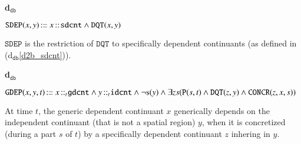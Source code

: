\documentclass[ao]{iosart2x}
\newcommand{\bfoAxLabel}{\textrm{a$_\texttt{b}$}}
\newcommand{\dolceDefLabel}{\textrm{d$_\texttt{d}$}}
\newcommand{\dbDefLabel}{\textrm{d$_\texttt{db}$}}
\newcounter{cntdbdf}
\newcommand{\dbdf}[1]{\refstepcounter{cntdbdf}\begin{small}{\bf \dbDefLabel\thecntdbdf\label{#1}}\end{small}}
\newcommand{\refdolcedf}[1]{({\dolceDefLabel}\ref{#1})}
\newcommand{\refbfoax}[1]{({\bfoAxLabel}\ref{#1})}
\newcommand{\refdbdf}[1]{({\dbDefLabel}\ref{#1})}
\newcommand{\pr}[1]{\mathtt{#1}}
\newcommand{\cn}[1]{\mathtt{#1}}
\newcommand\textequal{%
 \rule[.08ex]{5pt}{0.35pt}\llap{\rule[.78ex]{5pt}{0.35pt}}}
\newcommand{\sdef}{{\hspace{1.5pt}:\hspace{-2.5pt}\textequal\hspace{3pt}}}
\newcommand{\bfo}{{\textsc{bfo}}}
\newcommand {\Sdcat} {\textsc{s}}
\newcommand {\Pd} {\ensuremath{\pr{P}}}
\newcommand {\DQTd} {\ensuremath{\pr{DQT}}}
\newcommand {\SDd} {\ensuremath{\pr{SD}}}
\newcommand {\EXDd} {\ensuremath{\pr{EXD}}}
\newcommand{\idcntbcat}{\cn{idcnt}}
\newcommand{\gdcntbcat}{\cn{gdcnt}}
\newcommand{\sdcntbcat}{\cn{sdcnt}}
\newcommand{\procbcat}{\cn{proc}}
\newcommand{\bfocoverlap}{\pr{cO}}
\newcommand{\bfoiof}[1]{{\,::_{#1\:\!}}}
\newcommand{\bfosdep}{\pr{SDEP}}
\newcommand{\bfogdep}{\pr{GDEP}}
\newcommand{\bfoconcr}{\pr{CONCR}}
\begin{document}
\item[\dbdf{d2b_sdep}] $\bfosdep(x,y) \sdef x \bfoiof{} \sdcntbcat \land \DQTd(x,y)$

\vspace{1pt}
$\bfosdep$ is the restriction of $\DQTd$ to specifically dependent continuants (as defined in \refdbdf{d2b_sdcnt}).

%
%
%
%

\item[\dbdf{d2b_gdep}] $\bfogdep(x,y,t) \sdef x \bfoiof{t} \gdcntbcat \land y \bfoiof{t} \idcntbcat \land \neg\Sdcat(y) \land \exists zs(\Pd(s,t) \land \DQTd(z,y) \land \bfoconcr(z,x,s))$

\vspace{1pt}
At time $t$, the generic dependent continuant $x$ generically depends on the independent continuant (that is not a spatial region) $y$, when it is concretized (during a part $s$ of $t$) by a specifically dependent continuant $z$ inhering in $y$. 

%
\end{document}
